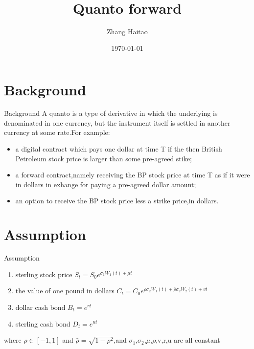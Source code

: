 \documentclass[15pt]{beamer}
\begin{document}
\title{Quanto forward}
\author{Zhang Haitao}
\date{\today}

\frame[plain]{\titlepage}


\begin{frame}{\contentsname}
	\tableofcontents
\end{frame}



\section{Background}
	\begin{frame}{Background}
	A quanto is a type of derivative in which the underlying is denominated in one currency, but the instrument itself is settled in another currency at some rate.For example:
	
	\begin{itemize}
		\item a digital contract which pays one dollar at time T if the then British Petroleum stock price is larger than some pre-agreed stike;
		
		\item a forward contract,namely receiving the BP stock price at time T as if it were in dollars in exhange for paying a pre-agreed dollar amount;
		
		\item an option to receive the BP stock price less a strike price,in dollars.
	\end{itemize}
	\end{frame}
	


\section{Assumption}
	\begin{frame}{Assumption}
		\begin{enumerate}
			\item sterling stock price $S_t=S_0e^{\sigma_1W_1(t)+\mu t}$
			
			\item the value of one pound in dollars $C_t=C_0e^{\rho      \sigma_2W_1(t)+\bar {\rho}\sigma_2W_2(t)+vt}$
			
			\item dollar cash bond $B_t=e^{rt} $  
			
			\item sterling cash bond $D_t=e^{ut} $
		\end{enumerate}
		
		where $\rho\in [-1,1]$ and $\bar \rho=\sqrt{1-\rho^2}$,and $\sigma_1$,$\sigma_2$,$\mu$,$\rho$,v,r,u are all constant 
		
	\end{frame}
\end{document}
